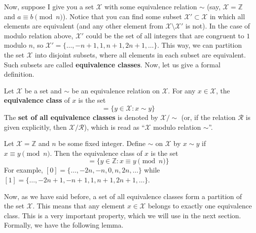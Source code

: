 \documentclass[../lecture-notes.tex]{subfiles}
\begin{document}
Now, suppose I give you a set $\mathcal{X}$ with some equivalence relation $\sim$ (say, $\mathcal{X} = \mathbb{Z}$ and $a \equiv b \pmod{n}$). Notice that you can find some subset $\mathcal{X}' \subset \mathcal{X}$ in which all elements are equivalent (and any other element from $\mathcal{X} \setminus \mathcal{X}'$ is not). In the case of modulo relation above, $\mathcal{X}'$ could be the set of all integers that are congruent to $1$ modulo $n$, so $\mathcal{X}' = \{\dots,-n+1,1,n+1,2n+1,\dots\}$. This way, we can partition the set $\mathcal{X}$ into disjoint subsets, where all elements in each subset are equivalent. Such subsets are called \textbf{equivalence classes}. Now, let us give a formal definition.

\begin{definition}
    Let $\mathcal{X}$ be a set and $\sim$ be an equivalence relation on $\mathcal{X}$. For any $x \in \mathcal{X}$, the \textbf{equivalence class} of $x$ is the set
    \begin{equation*}
        [x] = \{y \in \mathcal{X}: x \sim y\}
    \end{equation*}
    The \textbf{set of all equivalence classes} is denoted by $\mathcal{X}/\text{$\sim$}$ (or, if the relation $\mathcal{R}$ is given explicitly, then $\mathcal{X}/\mathcal{R}$), which is read as ``$\mathcal{X}$ modulo relation $\sim$''.
\end{definition}

\begin{example}
    Let $\mathcal{X} = \mathbb{Z}$ and $n$ be some fixed integer. Define $\sim$ on $\mathcal{X}$ by $x \sim y$ if $x \equiv y \pmod{n}$. Then the equivalence class of $x$ is the set
    \begin{equation*}
        [x] = \{y \in \mathbb{Z}: x \equiv y \pmod{n}\}
    \end{equation*}
    For example, $[0] = \{\ldots,-2n,-n,0,n,2n,\ldots\}$ while $[1] = \{\ldots,-2n+1,-n+1,1,n+1,2n+1,\ldots\}$.
\end{example}

\vspace{-2.5mm}

Now, as we have said before, a set of all equivalence classes form a partition of the set $\mathcal{X}$. This means that any element $x \in \mathcal{X}$ belongs to exactly one equivalence class. This is a very important property, which we will use in the next section. Formally, we have the following lemma.

\vspace{-2.5mm}
\end{document}
